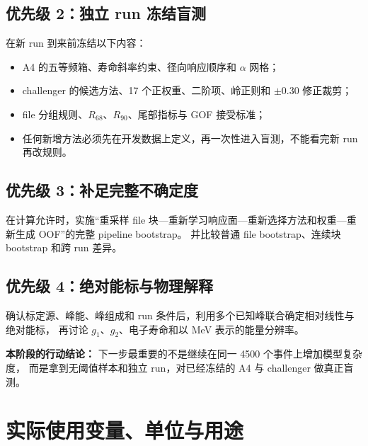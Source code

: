 \documentclass[UTF8,12pt,a4paper,oneside,fontset=none]{ctexart}
\numberwithin{equation}{section}
\newcommand{\Rsixtyeight}{R_{68}}
\newcommand{\Rninety}{R_{90}}
\begin{document}
\subsection{优先级 2：独立 run 冻结盲测}

在新 run 到来前冻结以下内容：

\begin{itemize}
  \item A4 的五等频箱、寿命斜率约束、径向响应顺序和 \(\alpha\) 网格；
  \item challenger 的候选方法、17 个正权重、二阶项、岭正则和 \(\pm0.30\) 修正裁剪；
  \item file 分组规则、\(\Rsixtyeight\)、\(\Rninety\)、尾部指标与 GOF 接受标准；
  \item 任何新增方法必须先在开发数据上定义，再一次性进入盲测，不能看完新 run 再改规则。
\end{itemize}

\subsection{优先级 3：补足完整不确定度}

在计算允许时，实施“重采样 file 块—重新学习响应面—重新选择方法和权重—重新生成 OOF”的完整 pipeline bootstrap。
并比较普通 file bootstrap、连续块 bootstrap 和跨 run 差异。

\subsection{优先级 4：绝对能标与物理解释}

确认标定源、峰能、峰组成和 run 条件后，利用多个已知峰联合确定相对线性与绝对能标，
再讨论 \(g_1\)、\(g_2\)、电子寿命和以 MeV 表示的能量分辨率。

\noindent\textbf{\color{PandaTeal}本阶段的行动结论：}
下一步最重要的不是继续在同一 4500 个事件上增加模型复杂度，
而是拿到无阈值样本和独立 run，对已经冻结的 A4 与 challenger 做真正盲测。

\clearpage
\appendix

\section{实际使用变量、单位与用途}
\end{document}
